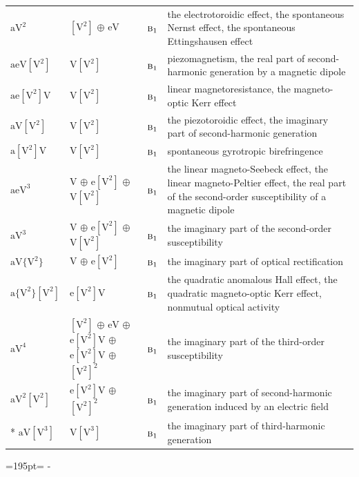 \documentclass[10pt,a4paper]{article}
\newcommand{\needspace}[1]{\par\penalty-100\begingroup\dimen0=#1\relax\dimen2=\pagegoal
  \advance\dimen2-\pagetotal\ifdim\dimen0>\dimen2\relax\ifdim\dimen2>0pt\vfil\break\fi\fi
  \endgroup}
\numberwithin{equation}{section}
\newcommand{\irr}[1]{\text{\normalfont\scshape #1}}
\newcommand{\jahn}[1]{\mathrm{#1}}
\newlength{\fillwidth}\newlength{\cellwidth}\newlength{\colwidth}
\begin{document}
{\begin{longtable}{@{}lll>{\RaggedRight\arraybackslash}p{\fillwidth}@{}}
$\jahn{aV^{2}}$ & $\jahn{[V^{2}]}$ $\oplus$ $\jahn{eV}$ & $\irr{b}_{1}$ & the electrotoroidic effect, the spontaneous Nernst effect, the spontaneous Ettingshausen effect\\
$\jahn{aeV[V^{2}]}$ & $\jahn{V[V^{2}]}$ & $\irr{b}_{1}$ & piezomagnetism, the real part of second-harmonic generation by a magnetic dipole\\
$\jahn{ae[V^{2}]V}$ & $\jahn{V[V^{2}]}$ & $\irr{b}_{1}$ & linear magnetoresistance, the magneto-optic Kerr effect\\
$\jahn{aV[V^{2}]}$ & $\jahn{V[V^{2}]}$ & $\irr{b}_{1}$ & the piezotoroidic effect, the imaginary part of second-harmonic generation\\
$\jahn{a[V^{2}]V}$ & $\jahn{V[V^{2}]}$ & $\irr{b}_{1}$ & spontaneous gyrotropic birefringence\\
$\jahn{aeV^{3}}$ & $\jahn{V}$ $\oplus$ $\jahn{e[V^{2}]}$ $\oplus$ $\jahn{V[V^{2}]}$ & $\irr{b}_{1}$ & the linear magneto-Seebeck effect, the linear magneto-Peltier effect, the real part of the second-order susceptibility of a magnetic dipole\\
$\jahn{aV^{3}}$ & $\jahn{V}$ $\oplus$ $\jahn{e[V^{2}]}$ $\oplus$ $\jahn{V[V^{2}]}$ & $\irr{b}_{1}$ & the imaginary part of the second-order susceptibility\\
$\jahn{aV\{V^{2}\}}$ & $\jahn{V}$ $\oplus$ $\jahn{e[V^{2}]}$ & $\irr{b}_{1}$ & the imaginary part of optical rectification\\
$\jahn{a\{V^{2}\}[V^{2}]}$ & $\jahn{e[V^{2}]V}$ & $\irr{b}_{1}$ & the quadratic anomalous Hall effect, the quadratic magneto-optic Kerr effect, nonmutual optical activity\\
$\jahn{aV^{4}}$ & $\jahn{[V^{2}]}$ $\oplus$ $\jahn{eV}$ $\oplus$ $\jahn{e[V^{2}]V}$ $\oplus$ $\jahn{e[V^{2}]V}$ $\oplus$ $\jahn{[V^{2}]^{2}}$ & $\irr{b}_{1}$ & the imaginary part of the third-order susceptibility\\
$\jahn{aV^{2}[V^{2}]}$ & $\jahn{e[V^{2}]V}$ $\oplus$ $\jahn{[V^{2}]^{2}}$ & $\irr{b}_{1}$ & the imaginary part of second-harmonic generation induced by an electric field\\*
$\jahn{aV[V^{3}]}$ & $\jahn{V[V^{3}]}$ & $\irr{b}_{1}$ & the imaginary part of third-harmonic generation\\
\bottomrule\end{longtable}}
\needspace{195pt}
\end{document}
